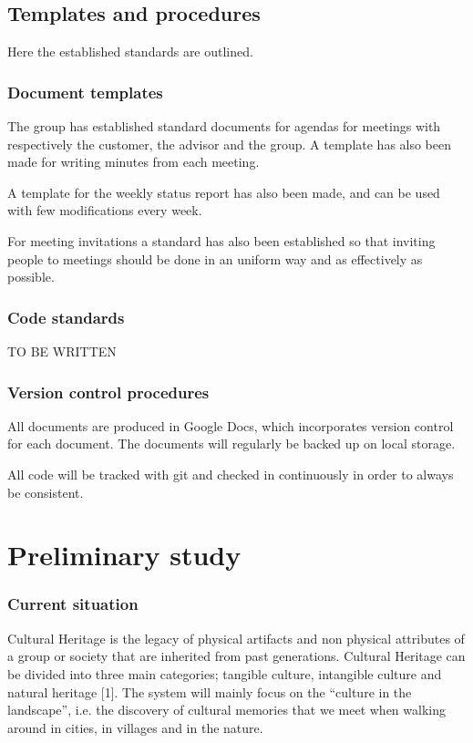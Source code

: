 \documentclass[11pt]{book}
\begin{document}
\section{Templates and procedures}
Here the established standards are outlined.

\subsection{Document templates}
The group has established standard documents for agendas for meetings with respectively the customer, the advisor and the group. A template has also been made for writing minutes from each meeting.

A template for the weekly status report has also been made, and can be used with few modifications every week.

For meeting invitations a standard has also been established so that inviting people to meetings should be done in an uniform way and as effectively as possible.

\subsection{Code standards}
TO BE WRITTEN

\subsection{Version control procedures}
All documents are produced in Google Docs, which incorporates version control for each document. The documents will regularly be backed up on local storage.

All code will be tracked with git and checked in continuously in order to always be consistent.

\chapter{Preliminary study}

\subsection{Current situation}
Cultural Heritage is the legacy of physical artifacts and non physical attributes of a group or society that are inherited from past generations. Cultural Heritage can be divided into three main categories; tangible culture, intangible culture and natural heritage [1]. The system will mainly focus on the “culture in the landscape”, i.e. the discovery of cultural memories that we meet when walking around in cities, in villages and in the nature.
\end{document}
